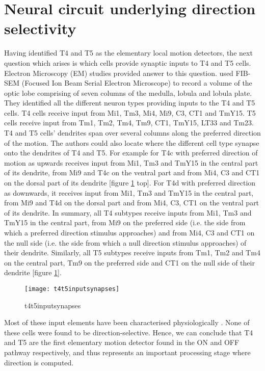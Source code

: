 \section{Neural circuit underlying direction selectivity}
Having identified T4 and T5 as the elementary local motion detectors, the next question which arises is which cells provide synaptic inputs to T4 and T5 cells. Electron Microscopy (EM) studies \parencite{Shinomiya2019, Takemura2017} provided answer to this question. \cite{Shinomiya2019} used FIB-SEM (Focused Ion Beam Serial Electron Microscope) to record a volume of the optic lobe comprising of seven columns of the medulla, lobula and lobula plate. They identified all the different neuron types providing inputs to the T4 and T5 cells. T4 cells receive input from Mi1, Tm3, Mi4, Mi9, C3, CT1 and TmY15. T5 cells receive input from Tm1, Tm2, Tm4, Tm9, CT1, TmY15, LT33 and Tm23. T4 and T5 cells' dendrites span over several columns along the preferred direction of the motion. The authors could also locate where the different cell type synapse onto the dendrites of T4 and T5. For example for T4c with preferred direction of motion as upwards receives input from Mi1, Tm3 and TmY15 in the central part of its dendrite, from Mi9 and T4c on the ventral part and from Mi4, C3 and CT1 on the dorsal part of its dendrite [figure \ref{fig:t4t5inputsynapses} top]. For T4d with preferred direction as downwards, it receives input from Mi1, Tm3 and TmY15 in the central part, from Mi9 and T4d on the dorsal part and from Mi4, C3, CT1 on the ventral part of its dendrite. In summary, all T4 subtypes receive inputs from Mi1, Tm3 and TmY15 in the central part, from Mi9 on the preferred side (i.e. the side from which a preferred direction stimulus approaches) and from Mi4, C3 and CT1 on the null side (i.e. the side from which a null direction stimulus approaches) of their dendrite. Similarly, all T5 subtypes receive inputs from Tm1, Tm2 and Tm4 on the central part, Tm9 on the preferred side and CT1 on the null side of their dendrite [figure \ref{fig:t4t5inputsynapses}]. %

\begin{figure}
\centering
\texttt{[image: t4t5inputsynapses]}
\caption{t4t5inputsynapses}
\label{fig:t4t5inputsynapses}
\end{figure}

Most of these input elements have been characterised physiologically \parencite{Arenz2017, Serbe2016, Strother2017, Meier2019, Borst2020}. None of these cells were found to be direction-selective. Hence, we can conclude that T4 and T5 are the first elementary motion detector found in the ON and OFF pathway respectively, and thus represents an important processing stage where direction is computed.    

